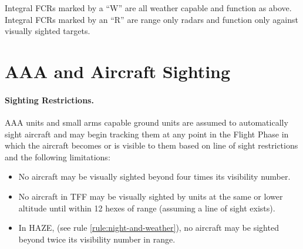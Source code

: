 Integral FCRs marked by a “W” are all weather capable and function as above. Integral FCRs marked by an “R” are range only radars and function only against visually sighted targets.

\section{AAA and Aircraft Sighting}

\paragraph{Sighting Restrictions.} AAA units and small arms capable ground units are assumed to automatically sight aircraft and may begin tracking them at any point in the Flight Phase in which the aircraft becomes or is visible to them based on line of sight restrictions and the following limitations:

\begin{itemize}

    \item No aircraft may be visually sighted beyond four times its visibility number.

    \item No aircraft in TFF may be visually sighted by units at the same or lower altitude until within 12 hexes of range (assuming a line of sight exists).

    \item In HAZE, (see rule \ref{rule:night-and-weather}), no aircraft may be sighted beyond twice its visibility number in range.
    

\end{itemize}


